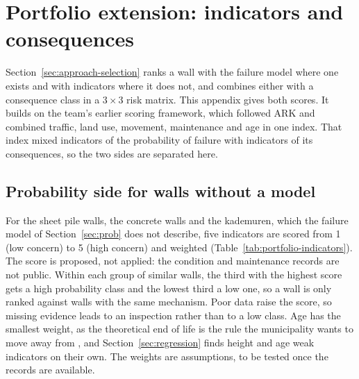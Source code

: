 \chapter{Portfolio extension: indicators and consequences}
\label{app:portfolio}

Section~\ref{sec:approach-selection} ranks a wall with the failure model where
one exists and with indicators where it does not, and combines either with a
consequence class in a $3\times3$ risk matrix. This appendix gives both scores.
It builds on the team's earlier scoring framework, which followed ARK
\parencite{ark2023} and combined traffic, land use, movement, maintenance and
age in one index. That index mixed indicators of the probability of failure
with indicators of its consequences, so the two sides are separated here.

\section{Probability side for walls without a model}\label{app:portfolio-hazard}

For the sheet pile walls, the concrete walls and the kademuren, which the
failure model of Section~\ref{sec:prob} does not describe, five indicators are
scored from 1 (low concern) to 5 (high concern) and weighted
(Table~\ref{tab:portfolio-indicators}). The score is proposed, not applied: the
condition and maintenance records are not public. Within each group of similar
walls, the third with the highest score gets a high probability class and the
lowest third a low one, so a wall is only ranked against walls with the same
mechanism. Poor data raise the score, so missing evidence leads to an
inspection rather than to a low class. Age has the smallest weight, as the
theoretical end of life is the rule the municipality wants to move away from
\parencite{utrecht_teamchallenge2026}, and Section~\ref{sec:regression} finds
height and age weak indicators on their own. The weights are assumptions, to be
tested once the records are available.

